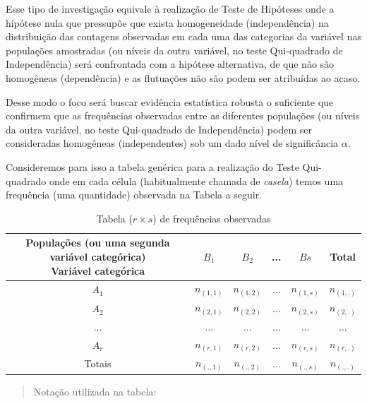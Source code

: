 \documentclass[
]{book}
\begin{document}
\hfill\break

Esse tipo de investigação equivale à realização de Teste de Hipóteses onde a hipótese nula que pressupõe que exista homogeneidade (independência) na distribuição das contagens observadas em cada uma das categorias da variável nas populações amostradas (ou níveis da outra variável, no teste Qui-quadrado de Independência) será confrontada com a hipótese alternativa, de que não são homogêneas (dependência) e as flutuações não são podem ser atribuídas ao acaso.

\hfill\break
Desse modo o foco será buscar evidência estatística robusta o suficiente que confirmem que as frequências observadas entre as diferentes populações (ou níveis da outra variável, no teste Qui-quadrado de Independência) podem ser consideradas homogêneas (independentes) sob um dado nível de significância \(\alpha\).

\hfill\break

Consideremos para isso a tabela genérica para a realização do Teste Qui-quadrado onde em cada célula (habitualmente chamada de \emph{casela}) temos uma frequência (uma quantidade) observada na Tabela a seguir.

\hfill\break

\begin{table}[h]
\centering
\caption{Tabela ($r \times s$) de frequências observadas}
\begin{tabular}{|c|c|c|c|c|c|}
    \hline 
    \shortstack{Populações (ou uma segunda variável categórica) \\ Variável categórica}  & $B_{1}$  & $B_{2}$   & ... & $B{s}$ & Total \\ 
    \hline 
    $A_{1}$   & $n_{(1,1)}$ & $n_{(1,2)}$ & ... & $n_{(1,s)}$ & $n_{(1,.)}$ \\
    $A_{2}$   & $n_{(2,1)}$ & $n_{(2,2)}$ & ... & $n_{(2,s)}$ & $n_{(2,.)}$ \\
    ...       & ...       & ...       & ... & ...      & ...      \\
    $A_{r}$   & $n_{(r,1)}$ & $n_{(r,2)}$ & ... & $n_{(r,s)}$ & $n_{(r,.)}$ \\
    \hline
    Totais &  $n_{(.,1)}$ &  $n_{(.,2)}$ & ... &  $n_{(.,s)}$ &  $n_{(.,.)}$\\
    \hline 
\end{tabular} 
\end{table}

\hfill\break

\hfill\break

\begin{quote}
Notação utilizada na tabela:
\end{quote}
\end{document}
